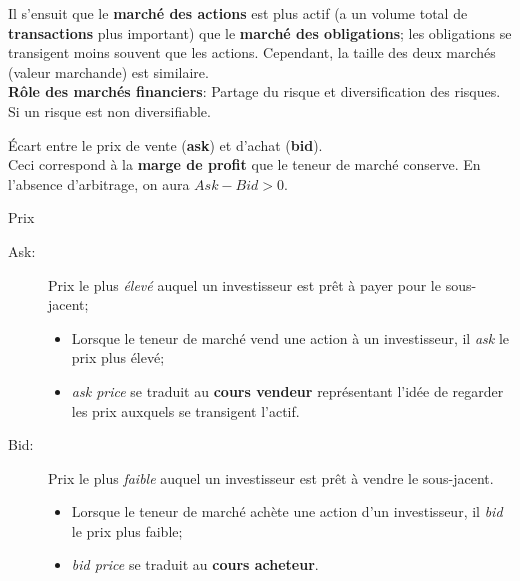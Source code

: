 \documentclass[10pt, french]{article}
\begin{document}
\begin{multicols*}{2}
Il s'ensuit que le \textbf{marché des actions} est plus actif (a un volume total de \textbf{transactions} plus important) que le \textbf{marché des obligations}; les obligations se transigent moins souvent que les actions. Cependant, la taille des deux marchés (valeur marchande) est similaire.\\

\textbf{Rôle des marchés financiers}: Partage du risque et diversification des risques. Si un risque est non diversifiable.\\

\begin{definitionNOHFILL}
Écart entre le prix de vente (\textbf{ask}) et d'achat (\textbf{bid}).\\

Ceci correspond à la \textbf{marge de profit} que le teneur de marché conserve. En l'absence d'arbitrage, on aura $Ask - Bid > 0$.

\begin{conceptgen}{Prix}
\begin{description}
	\item[Ask:] Prix le plus \textit{élevé} auquel un investisseur est prêt à payer pour le sous-jacent;
		\begin{itemize}[leftmargin = *]
		\item	Lorsque le teneur de marché vend une action à un investisseur, il \textit{ask} le prix plus élevé;
		\item	\og \textit{ask price} \fg{} se traduit au \textbf{cours vendeur} représentant l'idée de regarder les prix auxquels se transigent l'actif.
		\end{itemize}
	\item[Bid:] Prix le plus \textit{faible} auquel un investisseur est prêt à vendre le sous-jacent.
		\begin{itemize}[leftmargin = *]
		\item	Lorsque le teneur de marché achète une action d'un investisseur, il \textit{bid} le prix plus faible;
		\item	\og \textit{bid price} \fg{} se traduit au \textbf{cours acheteur}.
		\end{itemize}
\end{description}

\end{conceptgen}

\end{definitionNOHFILL}


\end{multicols*}
\end{document}
